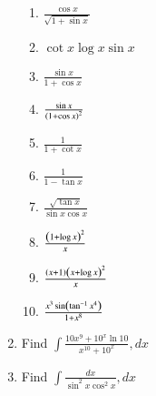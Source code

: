 \begin{enumerate}[label=\arabic*.,ref=\thesubsection.\theenumi]
\begin{enumerate}[label = (\roman*)]
\item $\frac{\cos {x}}{\sqrt{1+\sin x}}$
\item $\cot x \log x \sin x$
\item $\frac{\sin {x}}{1+\cos x}$
\item $\frac{\sin {x}}{\left(1+\cos x\right)^2}$
\item $\frac{1}{1+\cot x}$
\item $\frac{1}{1-\tan x}$
\item $\frac{\sqrt{\tan {x}}}{\sin x\cos x}$
\item $\frac{\left(1+\log x\right)^2}{x}$
\item $\frac{\left(x+1\right)\left(x +\log x\right)^2}{x}$
\item $\frac{x^3\sin\left(\tan^{-1}x^4\right)}{1+x^8}$
%
\end{enumerate}
\item Find 
$
\int \frac{10x^9+10^x\ln 10}{x^10+10^x},dx
$
\item Find 
$
\int \frac{dx}{\sin^2 x \cos^2 x},dx
$
\end{enumerate}
